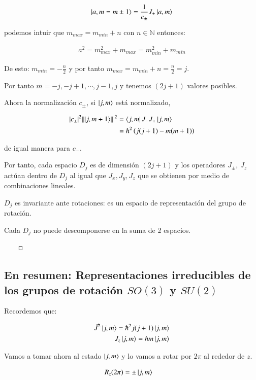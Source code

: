 \begin{align}
    \ket{a,m=m\pm1}=\frac{1}{c_\pm}J_\pm\ket{a,m}
\end{align}

podemos intuir que $m_{max}=m_{min}+n$ con $n\in \mathbb{N}$ entonces:

\begin{align}
    a^2=m^2_{max}+m_{max}=m_{min}^2+m_{min}
\end{align}

De esto: $m_{min}=-\frac{n}{2}$ y por tanto $m_{max}=m_{min}+n=\frac{n}{2}=j$.

Por tanto $m=-j,-j+1,\cdots,j-1,j$ y tenemos $(2j+1)$ valores posibles.

Ahora la normalización $c_\pm$, si $\ket{j,m}$ está normalizado,

\begin{align*}
    \abs{c_{\pm}}^2\norm*{\ket{j,m+1}}^2
        &=\bra{j,m}J_-J_+\ket{j,m}\\
        &=\hbar^2 \left(j(j+1)-m(m+1)\right)
\end{align*}

de igual manera para $c_-$.

Por tanto, cada espacio $D_j$ es de dimensión $(2j+1)$ y los operadores $J_\pm$, $J_z$ actúan dentro de $D_j$ al igual que $J_x,J_y,J_z$ que se obtienen por medio de combinaciones lineales. 

$D_j$ es invariante ante rotaciones: es un espacio de representación del grupo de rotación.

Cada $D_j$ no puede descomponerse en la suma de 2 espacios. 

\hfill$\qed$

\subsection{En resumen: Representaciones irreducibles de los grupos de rotación $SO(3)$ y $SU(2)$}

Recordemos que:

\begin{align*}
    \vec{J}^2\ket{j,m}=\hbar^2j(j+1)\ket{j,m}\\
    J_z\ket{j,m}=\hbar m\ket{j,m}
\end{align*}

Vamos a tomar ahora al estado $\ket{j,m}$ y lo vamos a rotar por $2\pi$ al rededor de $z$.

\begin{align*}
    R_z(2\pi)
        &=\pm\ket{j,m}
\end{align*}

